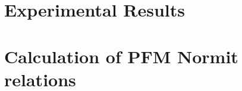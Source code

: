 \documentclass{article}
\begin{document}
\section{Experimental Results}
\section{Calculation of PFM Normit relations}



\end{document}

